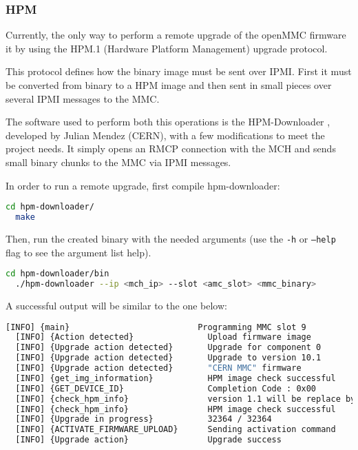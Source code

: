 \documentclass[letterpaper,12pt, titlepage]{article}
\begin{document}
\subsubsection{HPM}
Currently, the only way to perform a remote upgrade of the openMMC firmware it by using the HPM.1 (Hardware Platform Management) upgrade protocol.

This protocol defines how the binary image must be sent over IPMI. First it must be converted from binary to a HPM image and then sent in small pieces over several IPMI messages to the MMC.

The software used to perform both this operations is the HPM-Downloader \cite{hpm-github}, developed by Julian Mendez (CERN), with a few modifications to meet the project needs. It simply opens an RMCP connection with the MCH and sends small binary chunks to the MMC via IPMI messages.

In order to run a remote upgrade, first compile hpm-downloader:

\begin{lstlisting}[language=bash]
  cd hpm-downloader/
  make
\end{lstlisting}

Then, run the created binary with the needed arguments (use the \texttt{-h} or \texttt{--help} flag to see the argument list help).

\begin{lstlisting}[language=bash]
  cd hpm-downloader/bin
  ./hpm-downloader --ip <mch_ip> --slot <amc_slot> <mmc_binary>
\end{lstlisting}

A successful output will be similar to the one below:
\begin{lstlisting}[language=bash]
  [INFO] {main}                          Programming MMC slot 9
  [INFO] {Action detected}               Upload firmware image
  [INFO] {Upgrade action detected}       Upgrade for component 0
  [INFO] {Upgrade action detected}       Upgrade to version 10.1
  [INFO] {Upgrade action detected}       "CERN MMC" firmware
  [INFO] {get_img_information}           HPM image check successful
  [INFO] {GET_DEVICE_ID}                 Completion Code : 0x00
  [INFO] {check_hpm_info}                version 1.1 will be replace by 0.1
  [INFO] {check_hpm_info}                HPM image check successful
  [INFO] {Upgrade in progress}           32364 / 32364
  [INFO] {ACTIVATE_FIRMWARE_UPLOAD}      Sending activation command
  [INFO] {Upgrade action}                Upgrade success
\end{lstlisting}
\end{document}
